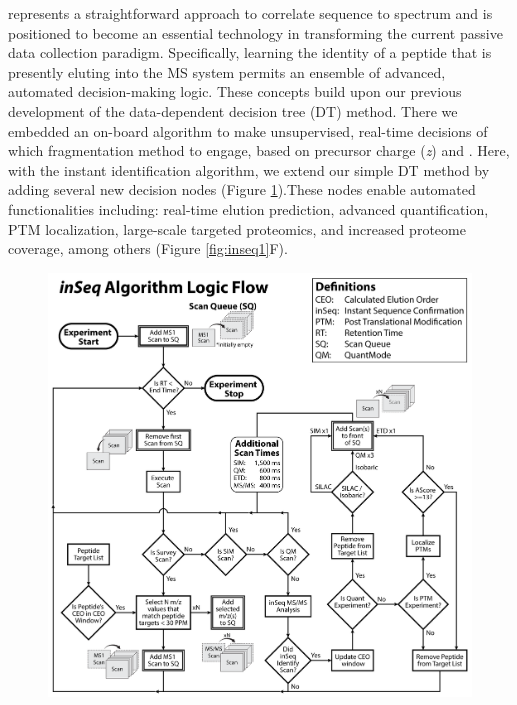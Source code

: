 \inseq{} represents a straightforward approach to correlate sequence to spectrum and is positioned to become an essential technology in transforming the current passive data collection paradigm. Specifically, learning the identity of a peptide that is presently eluting into the MS system permits an ensemble of advanced, automated decision-making logic. These concepts build upon our previous development of the data-dependent decision tree (DT) method. There we embedded an on-board algorithm to make unsupervised, real-time decisions of which fragmentation method to engage, based on precursor charge (\textit{z}) and \mz{}. Here, with the \inseq{} instant identification algorithm, we extend our simple DT method by adding several new decision nodes (Figure \ref{fig:inseqs4}).These nodes enable automated functionalities including: real-time elution prediction, advanced quantification, PTM localization, large-scale targeted proteomics, and increased proteome coverage, among others (Figure \ref{fig:inseq1}F).

\begin{figure}[p]
	\centering
	\includegraphics[width=\columnwidth]{inseq/inSeq_Fig S4.png}
	\label{fig:inseqs4}
\end{figure}

